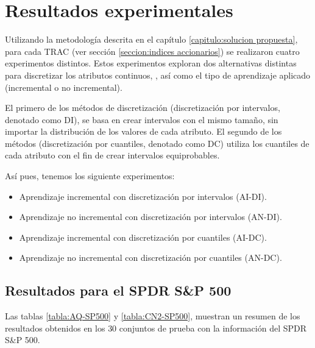 \documentclass[12pt]{report}
\theoremstyle{break}
\theoremstyle{break}
\begin{document}
\chapter[Capítulo \thechapter: Resultados experimentales]{Resultados experimentales}
\label{capitulo:resultados experimentales}
Utilizando la metodología descrita en el capítulo \ref{capitulo:solucion propuesta}, para cada TRAC (ver sección \ref{seccion:indices accionarios}) se realizaron cuatro experimentos distintos. Estos experimentos exploran dos alternativas distintas para discretizar los atributos continuos, \cite{dataMiningUsingR}, así como el tipo de aprendizaje aplicado (incremental o no incremental).

El primero de los métodos de discretización (discretización por intervalos, denotado como DI), se basa en crear intervalos con el mismo tamaño, sin importar la distribución de los valores de cada atributo. El segundo de los métodos (discretización por cuantiles, denotado como DC) utiliza los cuantiles de cada atributo con el fin de crear intervalos equiprobables.

Así pues, tenemos los siguiente experimentos:

\begin{itemize}
\item Aprendizaje incremental con discretización por intervalos (AI-DI).

\item Aprendizaje no incremental con discretización por intervalos (AN-DI).

\item Aprendizaje incremental con discretización por cuantiles (AI-DC).

\item Aprendizaje no incremental con discretización por cuantiles (AN-DC).

\end{itemize}

\section{Resultados para el SPDR S\&P 500}
\label{seccion:resultados sp500}
Las tablas \ref{tabla:AQ-SP500} y \ref{tabla:CN2-SP500}, muestran un resumen de los resultados obtenidos en los $30$ conjuntos de prueba con la información del SPDR S\&P 500.
\end{document}
